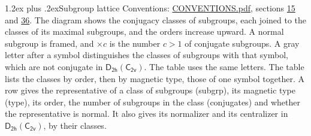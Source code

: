 \documentclass[10pt,a4paper]{article}
\makeatletter
\renewcommand\section{\@startsection{section}{1}{\z@}{-3ex plus -1ex minus -.2ex}%
  {1.2ex plus .2ex}{\normalfont\large\sffamily\bfseries\color{parttitle}}}
\numberwithin{equation}{section}
\newcommand{\grp}[1]{\mathsf{#1}}
\makeatother
\begin{document}
\section{Subgroup lattice}\label{s:subgroups}
Conventions: \href{../../CONVENTIONS.pdf}{CONVENTIONS.pdf}, sections \href{../../../rotation/CONVENTIONS.pdf\#conv.15}{15} and \href{../../CONVENTIONS.pdf\#conv.36}{36}.
The diagram shows the conjugacy classes of subgroups, each joined to the classes of its maximal subgroups, and the orders increase upward. \label{n:index.conjugates.c}A normal subgroup is framed, and ${\times}c$ is the number $c > 1$ of conjugate subgroups. \label{n:mark.letter}A gray letter after a symbol distinguishes the classes of subgroups with that symbol, which are not conjugate in $\grp{D_{2h}}(\grp{C_{2v}})$. The table uses the same letters. The table lists the classes by order, then by magnetic type, those of one symbol together. \label{n:head.subgroup}\label{n:head.magnetic.type}\label{n:head.order}\label{n:head.conjugates}\label{n:head.normal}A row gives the representative of a class of subgroups (subgrp), its magnetic type (type), its order, the number of subgroups in the class (conjugates) and whether the representative is normal. \label{n:head.normalizer}\label{n:head.centralizer}It also gives its normalizer and its centralizer in $\grp{D_{2h}}(\grp{C_{2v}})$, by their classes. 
\end{document}
